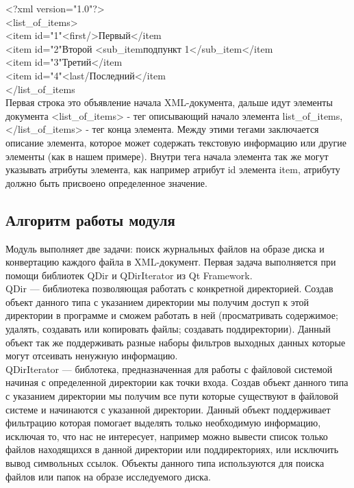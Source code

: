 <?xml version="1.0"?> \\
<list_of_items> \\
<item id="1"\><first/>Первый</item\> \\
<item id="2"\>Второй <sub_item\>подпункт 1</sub_item\></item\> \\
<item id="3"\>Третий</item\> \\
<item id="4"\><last/\>Последний</item\> \\
</list_of_items\> \\

Первая строка это объявление начала XML-документа, дальше идут элементы документа <list_of_items> - тег описывающий начало элемента list_of_items, </list_of_items> - тег конца элемента. Между этими тегами заключается описание элемента, которое может содержать текстовую информацию или другие элементы (как в нашем примере). Внутри тега начала элемента так же могут указывать атрибуты элемента, как например атрибут id элемента item, атрибуту должно быть присвоено определенное значение. \\

\subsection{Алгоритм работы модуля}

Модуль выполняет две задачи: поиск журнальных файлов на образе диска и конвертацию каждого файла в XML-документ. Первая задача выполняется при помощи библиотек QDir и QDirIterator из Qt Framework. \\

QDir — библиотека позволяющая работать с конкретной директорией. Создав объект данного типа с указанием директории мы получим доступ к этой директории в программе и сможем работать в ней (просматривать содержимое; удалять, создавать или копировать файлы; создавать поддиректории). Данный объект так же поддерживать разные наборы фильтров выходных данных которые могут отсеивать ненужную информацию. \\

QDirIterator — библотека, предназначенная для работы с файловой системой начиная с определенной директории как точки входа. Создав объект данного типа с указанием директории мы получим все пути которые существуют в файловой системе и начинаются с указанной директории. Данный объект поддерживает фильтрацию которая помогает выделять только необходимую информацию, исключая то, что нас не интересует, например можно вывести список только файлов находящихся в данной директории или поддиректориях, или исключить вывод символьных ссылок. Объекты данного типа используются для поиска файлов или папок на образе исследуемого диска. \\

